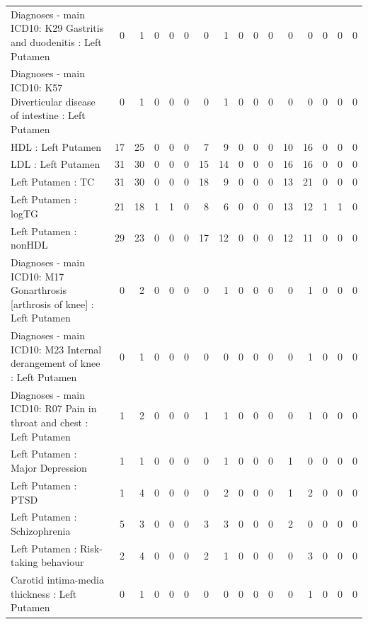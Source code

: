 \begin{table}[ht]
\begin{tabular}{lrrrrrrrrrrrrrrr}
  Diagnoses - main ICD10: K29 Gastritis and duodenitis : Left Putamen &   0 &   1 &   0 &   0 &   0 &   0 &   1 &   0 &   0 &   0 &   0 &   0 &   0 &   0 &   0 \\ 
  Diagnoses - main ICD10: K57 Diverticular disease of intestine : Left Putamen &   0 &   1 &   0 &   0 &   0 &   0 &   1 &   0 &   0 &   0 &   0 &   0 &   0 &   0 &   0 \\ 
  HDL : Left Putamen &  17 &  25 &   0 &   0 &   0 &   7 &   9 &   0 &   0 &   0 &  10 &  16 &   0 &   0 &   0 \\ 
  LDL : Left Putamen &  31 &  30 &   0 &   0 &   0 &  15 &  14 &   0 &   0 &   0 &  16 &  16 &   0 &   0 &   0 \\ 
  Left Putamen : TC &  31 &  30 &   0 &   0 &   0 &  18 &   9 &   0 &   0 &   0 &  13 &  21 &   0 &   0 &   0 \\ 
  Left Putamen : logTG &  21 &  18 &   1 &   1 &   0 &   8 &   6 &   0 &   0 &   0 &  13 &  12 &   1 &   1 &   0 \\ 
  Left Putamen : nonHDL &  29 &  23 &   0 &   0 &   0 &  17 &  12 &   0 &   0 &   0 &  12 &  11 &   0 &   0 &   0 \\ 
  Diagnoses - main ICD10: M17 Gonarthrosis [arthrosis of knee] : Left Putamen &   0 &   2 &   0 &   0 &   0 &   0 &   1 &   0 &   0 &   0 &   0 &   1 &   0 &   0 &   0 \\ 
  Diagnoses - main ICD10: M23 Internal derangement of knee : Left Putamen &   0 &   1 &   0 &   0 &   0 &   0 &   0 &   0 &   0 &   0 &   0 &   1 &   0 &   0 &   0 \\ 
  Diagnoses - main ICD10: R07 Pain in throat and chest : Left Putamen &   1 &   2 &   0 &   0 &   0 &   1 &   1 &   0 &   0 &   0 &   0 &   1 &   0 &   0 &   0 \\ 
  Left Putamen : Major Depression &   1 &   1 &   0 &   0 &   0 &   0 &   1 &   0 &   0 &   0 &   1 &   0 &   0 &   0 &   0 \\ 
  Left Putamen : PTSD &   1 &   4 &   0 &   0 &   0 &   0 &   2 &   0 &   0 &   0 &   1 &   2 &   0 &   0 &   0 \\ 
  Left Putamen : Schizophrenia &   5 &   3 &   0 &   0 &   0 &   3 &   3 &   0 &   0 &   0 &   2 &   0 &   0 &   0 &   0 \\ 
  Left Putamen : Risk-taking behaviour &   2 &   4 &   0 &   0 &   0 &   2 &   1 &   0 &   0 &   0 &   0 &   3 &   0 &   0 &   0 \\ 
  Carotid intima-media thickness : Left Putamen &   0 &   1 &   0 &   0 &   0 &   0 &   0 &   0 &   0 &   0 &   0 &   1 &   0 &   0 &   0 \\ 

\end{tabular}
\end{table}
